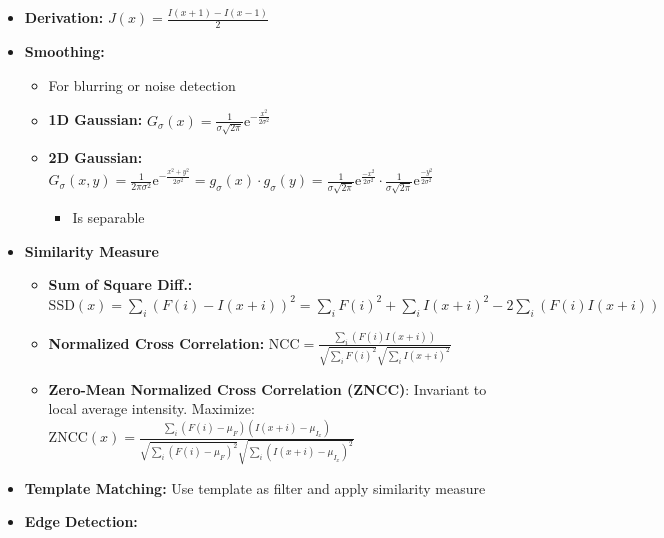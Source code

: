 \documentclass[a4paper]{article}
\newcommand{\ides}[1]{\item \textbf{#1}}
\begin{document}
\begin{itemize}
\begin{itemize}
            \ides{$\mathbf{2 \times 1D}$ with const.:}
        \end{itemize}
    \ides{Derivation:} $J(x) = \frac{I(x+1)-I(x-1)}{2}$
    \ides{Smoothing:}
        \begin{itemize}
            \item For blurring or noise detection
            \ides{1D Gaussian:} $G_\sigma(x) = \frac{1}{\sigma \sqrt{2 \pi}} \mathrm e^{-\frac{x^2}{2 \sigma^2}}$
            \ides{2D Gaussian:} $G_\sigma(x, y) = \frac{1}{2 \pi \sigma^2} \mathrm e^{-\frac{x^2 + y^2}{2 \sigma ^2}} = g_\sigma(x) \cdot g_\sigma(y) =
                \tfrac{1}{\sigma \sqrt{2\pi}} \mathrm e^{\frac{-x^2}{2\sigma^2}}
                \cdot
                \tfrac{1}{\sigma \sqrt{2\pi}} \mathrm e^{\frac{-y^2}{2\sigma^2}}$
                \begin{itemize}
                    \item Is separable
                \end{itemize}
        \end{itemize}
    \ides{Similarity Measure}
        \begin{itemize}
            \ides{Sum of Square Diff.:} $\mathrm{SSD}(x) =
                \sum_i (F(i) - I(x+i))^2 =
                \sum_i F(i)^2 + \sum_i I(x+i)^2 - 2 \sum_i (F(i) I(x+i))$
            \ides{Normalized Cross Correlation:} $\mathrm{NCC} =
                \frac{\sum_i (F(i)I(x + i))}
                {\sqrt{\sum_i F(i)^2} \sqrt{\sum_i I(x+i)^2}}$
            \ides{Zero-Mean Normalized Cross Correlation (ZNCC)}: Invariant to local average intensity. Maximize: $\mathrm{ZNCC}(x) =
                \frac{\sum_i (F(i)- \mu_F)(I(x + i) - \mu_{I_x})}
                {
                    \sqrt{\sum_i (F(i) - \mu_F)^2}
                    \sqrt{\sum_i (I(x+i) - \mu_{I_x})^2}
                }$
        \end{itemize}
    \ides{Template Matching:} Use template as filter and apply similarity measure
    \ides{Edge Detection:}

\end{itemize}
\end{document}
